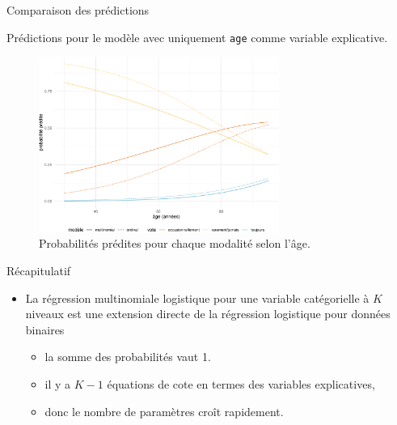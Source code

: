 \documentclass[
  ignorenonframetext,
]{beamer}
\providecommand{\tightlist}{%
  \setlength{\itemsep}{0pt}\setlength{\parskip}{0pt}}\usepackage{longtable,booktabs,array}
\begin{document}
\begin{frame}[fragile]{Comparaison des prédictions}
\protect\hypertarget{comparaison-des-pruxe9dictions}{}
\footnotesize

Prédictions pour le modèle avec uniquement \texttt{age} comme variable
explicative.

\begin{figure}

{\centering \includegraphics[width=0.7\textwidth,height=\textheight]{MATH60602-diapos8_files/figure-beamer/fig-predmultinom-1.pdf}

}

\caption{\label{fig-predmultinom}Probabilités prédites pour chaque
modalité selon l'âge.}

\end{figure}

\normalsize
\end{frame}

\begin{frame}{Récapitulatif}
\protect\hypertarget{ruxe9capitulatif-1}{}
\begin{itemize}
\tightlist
\item
  La régression multinomiale logistique pour une variable catégorielle à
  \(K\) niveaux est une extension directe de la régression logistique
  pour données binaires

  \begin{itemize}
  \tightlist
  \item
    la somme des probabilités vaut 1.
  \item
    il y a \(K-1\) équations de cote en termes des variables
    explicatives,
  \item
    donc le nombre de paramètres croît rapidement.
  \end{itemize}
\end{itemize}
\end{frame}
\end{document}
